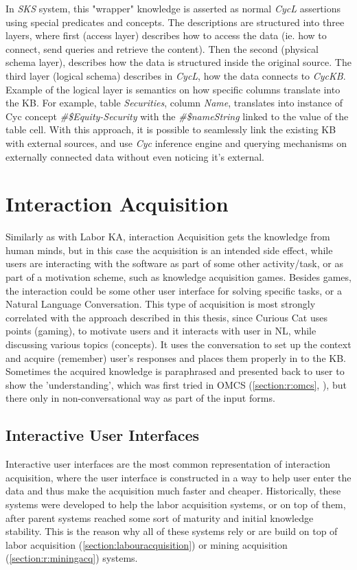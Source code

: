 In \emph{SKS} system, this "wrapper" knowledge is asserted as normal \emph{CycL}
assertions using special predicates and concepts. The descriptions are 
structured into three layers, where first (access layer) describes 
how to access the data (ie. how to connect, send queries and retrieve the 
content). Then the second (physical schema layer), describes how the data is
structured inside the original source. The third layer (logical schema) 
describes in \emph{CycL}, how  the data connects to \emph{CycKB}. Example
of the logical layer is semantics on how specific columns translate into the KB.
For example, table \emph{Securities}, column \emph{Name}, translates into
instance of Cyc concept \emph{\#\$Equity-Security} with the 
\emph{\#\$nameString} linked to the value of the table cell.
With this approach, it is possible to seamlessly link the existing KB with
external sources, and use \emph{Cyc} inference engine and querying mechanisms
on externally connected data without even noticing it's external.


\section{Interaction Acquisition}
\label{section:r:interaction}
Similarly as with Labor KA, interaction Acquisition gets the knowledge from 
human minds, but in this case the acquisition is an intended side effect, while
users are interacting with the software as part of some other activity/task, or
as part of a motivation scheme, such as knowledge acquisition games. Besides 
games, the interaction could be some other user interface for solving specific
tasks, or a Natural Language Conversation. This type of acquisition is most 
strongly correlated with the approach described in this thesis, since Curious 
Cat uses points (gaming), to motivate users and it interacts with user in NL, 
while discussing various topics (concepts). It uses the conversation to set up
the context and acquire (remember) user's responses and places them properly in
to the KB. Sometimes the acquired knowledge is paraphrased and presented back to
user to show the 'understanding', which was first tried in OMCS 
(\autoref{section:r:omcs}, \textcite{Singh2002b}), but there only in
non-conversational way as part of the input forms.
 
\subsection{Interactive User Interfaces}
\label{section:r:interactive}
Interactive user interfaces are the most common representation of interaction 
acquisition, where the user interface is constructed in a way to help user enter
the data and thus make the acquisition much faster and cheaper. Historically, 
these systems were developed to help the labor acquisition systems, or on top
of them, after parent systems reached some sort of maturity and initial 
knowledge stability. This is the reason why all of these systems rely or are 
build on top of labor acquisition (\autoref{section:labouracquisition}) or 
mining acquisition (\autoref{section:r:miningacq}) systems.

